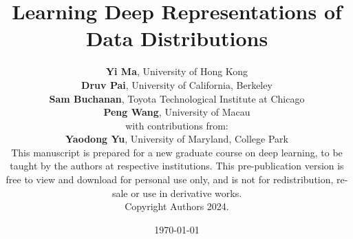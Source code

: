 \documentclass{book}
\numberwithin{equation}{section}
\begin{document}
\title{Learning Deep Representations of Data Distributions}


\author{\vspace{0.5cm}
	\textbf{Yi Ma},  University of Hong Kong \vspace{3mm}\\
	\textbf{Druv Pai}, University of California, Berkeley \vspace{3mm} \\
    \textbf{Sam Buchanan}, Toyota Technological Institute at Chicago     \vspace{3mm}\\
    \textbf{Peng Wang}, 
    University of Macau \vspace{10mm} \\
    with contributions from:\vspace{3mm}\\
    \textbf{Yaodong Yu},  University of Maryland, College Park
	\vspace{8cm}\\
	\footnotesize
	This manuscript is prepared for a new graduate course on deep learning, to be taught by the authors at respective institutions. This pre-publication version is free to view and download for personal use only, and is not for redistribution, re-sale or use in derivative works.\\  Copyright Authors 2024.
}

\date{\large \today}

\frontmatter
\titlepage
\thispagestyle{empty}
\maketitle
\cleardoublepage

% 

% 
\end{document}
